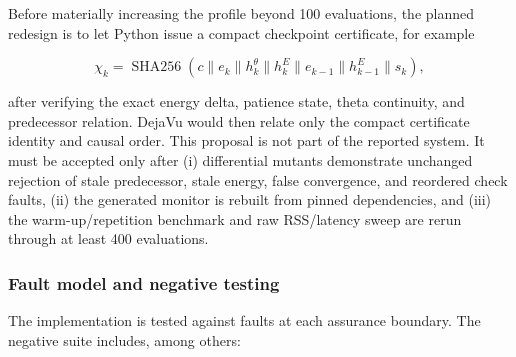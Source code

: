 Before materially increasing the profile beyond 100 evaluations, the planned
redesign is to let Python issue a compact checkpoint certificate, for example

\begin{equation}
  \chi_k=\operatorname{SHA256}\!\left(
  c\parallel e_k\parallel h^{\theta}_k\parallel h^E_k
  \parallel e_{k-1}\parallel h^E_{k-1}\parallel s_k\right),
  \label{eq:rv-future-certificate}
\end{equation}

after verifying the exact energy delta, patience state, theta continuity, and
predecessor relation.  DejaVu would then relate only the compact certificate
identity and causal order.  This proposal is not part of the reported system.
It must be accepted only after (i) differential mutants demonstrate unchanged
rejection of stale predecessor, stale energy, false convergence, and reordered
check faults, (ii) the generated monitor is rebuilt from pinned dependencies,
and (iii) the warm-up/repetition benchmark and raw RSS/latency sweep are rerun
through at least 400 evaluations.

\subsubsection{Fault model and negative testing}

The implementation is tested against faults at each assurance boundary.  The
negative suite includes, among others:


